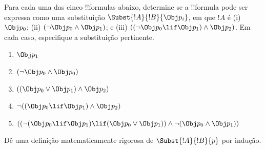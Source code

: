 \documentclass[../../../include/open-logic-section]{subfiles}
\begin{document}
\begin{prob} Para cada uma das cinco !!{formula}s abaixo, determine se a 
 !!{formula} pode ser expressa como uma substituição \( \Subst{!A}{!B}{\Obj p_i} \),
 em que \( !A \) é (i) \( \Obj p_0 \); (ii) \( ( \lnot \Obj p_0 \land \Obj
 p_1) \); e (iii) \( ( ( \lnot \Obj p_0 \lif \Obj p_1 ) \land \Obj
 p_2 ) \). Em cada caso, especifique a substituição pertinente.
  \begin{enumerate}
    \item \( \Obj p_1 \) 
    \item \( ( \lnot \Obj p_0 \land \Obj p_0 ) \)
    \item \( ( ( \Obj p_0 \lor \Obj p_1 ) \land \Obj p_2 )  \)
    \item \( \lnot ( ( \Obj p_0 \lif \Obj p_1 ) \land \Obj p_2 ) \)
    \item \( (( \lnot ( \Obj p_0 \lif \Obj p_1 ) \lif ( \Obj p_0 \lor \Obj p_1 )) \land \lnot ( \Obj p_0 \land \Obj p_1 )) \)
  \end{enumerate}
\end{prob}

\begin{prob}
Dê uma definição matematicamente rigorosa de $\Subst{!A}{!B}{p}$ por
indução.
\end{prob}
\end{document}
